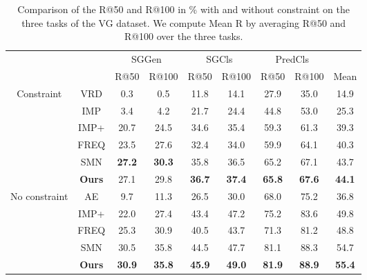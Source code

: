 \documentclass[10pt,twocolumn,letterpaper]{article}
\begin{document}
\begin{table*}[!t]
\centering
\small
\begin{tabular}{c|c|cc|cc|cc|c}
\hline
\multirow{2}{*}{} & \centering \multirow{2}{*}{Methods} & \multicolumn{2}{|c|}{SGGen}  & \multicolumn{2}{c|}{SGCls} & \multicolumn{2}{c|}{PredCls}  \\
 & & \quad R@50 \quad  & R@100\quad & \quad R@50\quad  &  R@100\quad  &  \quad  R@50\quad  &  R@100 \quad & Mean  \\
\hline
\hline
\multirow{6}{*}{Constraint} 
& \centering VRD \cite{lu2016visual} &  0.3 & 0.5   &  11.8 & 14.1 &  27.9  & 35.0 & 14.9  \\
& \centering IMP \cite{xu2017scene} & 3.4 & 4.2   &    21.7 & 24.4 &   44.8 & 53.0   & 25.3\\
& \centering IMP+ \cite{xu2017scene,zellers2017neural}& 20.7 & 24.5  & 34.6 & 35.4 & 59.3 & 61.3 & 39.3 \\
& \centering FREQ \cite{zellers2017neural} & 23.5 & 27.6  & 32.4 & 34.0 & 59.9 & 64.1 & 40.3 \\
& \centering SMN \cite{zellers2017neural} & \textbf{27.2} & \textbf{30.3} & 35.8 & 36.5  & 65.2 & 67.1  & 43.7\\
& \centering \textbf{Ours} & 27.1 &29.8   & \textbf{36.7} & \textbf{37.4} &  \textbf{65.8} & \textbf{67.6}  & \textbf{44.1}  \\
\hline
\multirow{5}{*}{No constraint} 
& \centering AE \cite{newell2017pixels}   & 9.7 & 11.3 & 26.5 & 30.0 & 68.0  & 75.2 & 36.8 \\
& \centering IMP+ \cite{xu2017scene,zellers2017neural}&22.0  & 27.4   & 43.4 & 47.2 & 75.2 &  83.6 & 49.8\\
& \centering FREQ \cite{zellers2017neural}  &25.3 & 30.9 & 40.5 & 43.7 &  71.3 & 81.2 & 48.8 \\
& \centering SMN \cite{zellers2017neural} & 30.5 & 35.8 & 44.5 & 47.7  & 81.1 & 88.3& 54.7\\
& \centering \textbf{Ours}  & \textbf{30.9} & \textbf{35.8}  & \textbf{45.9} & \textbf{49.0}  &  \textbf{81.9} & \textbf{88.9} &\textbf{55.4}  \\
\hline
\end{tabular}
\caption{Comparison of the R@50 and R@100 in \% with and without constraint on the three tasks of the VG dataset. We compute Mean R by averaging R@50 and R@100 over the three tasks.}
\label{table:vg-sota}
\end{table*}
\end{document}
